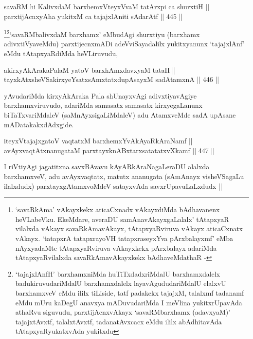 \begin{shl}
savaRM hi KalivxdaM barxhemxVteyxVvaM tatArxpi ca shurxtiH || \\
parxtijAcnxyA\s \s ha yukitxM ca tajajxlAniti sAdarAtf ||  445 ||  
\end{shl}

\begin{artha}
\footnote{`savaRkAma' vAkayxkekx aticaCxnadx vAkayxdiMda bAdhavanenx
  heVLabeVku. EkeMdare, averaDU samAnavAkayxgaLalalx' tAtapxyaR
  vilalxda vAkayx savaRkAmavAkayx, tAtapxyaRviruva vAkayx aticaCxnatx
  vAkayx. `tatapxrA tatapxrayoVH tatapxraseyxYva pArxbalayxmf' eMba
  nAyxyadaMte tAtapxyaRviruva vAkayxkekx pArxbalayx adariMda
  tAtapxyaRvilalxda savaRkAmavAkayxkekx bAdhaveMdathaR
  -}\footnote{`tajajxlAnfH' barxhamxniMda huTiTxdadxriMdalU
  barxhamxdalelx badukiruvudariMdalU barxhamxdalelx
  layavAgududariMdalU elalxvU barxhamxveV eMdu ililx tiLiside, tatf
  padakekx tajajxM, talalxmf tadanamf eMdu mUru kaDegU anavxya
  mADuvudariMda I meVlina yukitxrUpavAda athaRvu siguvudu,
  parxtijAcnxvAkayx `savaRMbarxhamx (adavxyaM)' tajajxtAvxtf,
  talalxtAvxtf, tadanatAvxcacx eMdu ililx abAdhitavAda
  tAtapxyaRyukatxvAda yukitxdu}`savaRMbalivxdaM barxhamx' eMbudAgi shurxtiyu
(barxhamx adivxtiVyaveMdu) parxtijecnxmADi adeVviSayadalilx
yukitxyanunx `tajajxlAnf' eMdu tAtapxyaRdiMda heVLiruvudu, 
\end{artha}


\begin{shl}
akirxyAkArakaPalaM yatoV barxhAmxdavxyaM tataH || \\
tayxkAtxsheVSakirxyeYsatxsAmxtatxdupAsayxM sadA\s \s tamxnA ||  446 ||  
\end{shl}

\begin{artha}
yAvudariMda kirxyAkAraka Pala shUnayxvAgi adivxtiyavAgiye
barxhamxviruvudo, adariMda samasatx samasatx kirxyegaLanunx
biTaTxvariMdaleV (saMnAyxsigaLiMdaleV) adu AtamxveMde sadA upAsane mADatakakxdAdxgide. 
\end{artha}

\begin{shl}
iteyxVtajajxgatoV vaqtatxM barxhemxYvAkAyaRkAraNamf || \\
avAyxvaqtAtxnanugataM parxtayxknABxtarxsatatatxvXkamf ||  447 ||  
\end{shl}

\begin{artha}
I riVtiyAgi jagatitxna savxBAvavu kAyARkAraNagaLeraDU alalxda
barxhamxveV,  adu avAyxvaqtatx, matutx ananugata (sAmAnayx
visheVSagaLu ilalxdudx) parxtayxgAtamxvoMdeV satayxvAda
savxrUpavuLaLxdudx ||
\end{artha}


